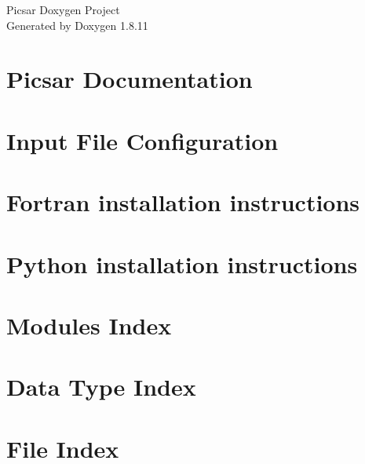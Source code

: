 \documentclass[twoside]{book}
\newcommand{\+}{\discretionary{\mbox{\scriptsize$\hookleftarrow$}}{}{}}
\newcommand{\clearemptydoublepage}{%
  \newpage{\pagestyle{empty}\cleardoublepage}%
}
\begin{document}
\hypersetup{pageanchor=false,
             bookmarksnumbered=true,
             pdfencoding=unicode
            }
\begin{titlepage}
\vspace*{7cm}
\begin{center}%
{\Large Picsar Doxygen Project }\\
\vspace*{1cm}
{\large Generated by Doxygen 1.8.11}\\
\end{center}
\end{titlepage}
\clearemptydoublepage
\tableofcontents
\clearemptydoublepage
{}
\hypersetup{pageanchor=true}

\chapter{Picsar Documentation}
\label{index}\hypertarget{index}{}
\chapter{Input File Configuration}
\label{Input File Configuration}
\hypertarget{Input File Configuration}{}

\chapter{Fortran installation instructions}
\label{Fortran installation instructions}
\hypertarget{Fortran installation instructions}{}

\chapter{Python installation instructions}
\label{Python installation instructions}
\hypertarget{Python installation instructions}{}

\chapter{Modules Index}

\chapter{Data Type Index}

\chapter{File Index}

\end{document}
